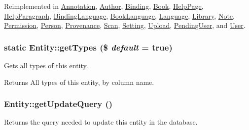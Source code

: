 Reimplemented in \hyperlink{classAnnotation_a9bc4933ab99e52e31b622a9829edd4bb}{Annotation}, \hyperlink{classAuthor_a83c8f19c169bcfffb4e0df09fadafe26}{Author}, \hyperlink{classBinding_aee5dd30aab182b19046ab5164da4c649}{Binding}, \hyperlink{classBook_ae4b3d3747fad76af4e4724a4bcf749a3}{Book}, \hyperlink{classHelpPage_a28380b31bea21840c86ab69c49cad198}{HelpPage}, \hyperlink{classHelpParagraph_a646492a40dad4d4a5cad0cd93e4e7cdb}{HelpParagraph}, \hyperlink{classBindingLanguage_a0f5427a1846d14c04dee6c35c73a0781}{BindingLanguage}, \hyperlink{classBookLanguage_a755bc7ed42e5d959d88a387485279ebd}{BookLanguage}, \hyperlink{classLanguage_a262653445a1324d6c02099e01cab0dff}{Language}, \hyperlink{classLibrary_a0b5dbae3b3d7138ad86c7df6e6a433eb}{Library}, \hyperlink{classNote_a83deedb316c670baa4b31c8d512e6af6}{Note}, \hyperlink{classPermission_a9a6694ebca8793f08c3f3388c27e0645}{Permission}, \hyperlink{classPerson_ab68a8aed417028b7755fb8c6c6fb2b62}{Person}, \hyperlink{classProvenance_ae8dd5db6f4bdc8c131f625b7e1287827}{Provenance}, \hyperlink{classScan_ad9ada4df484a671439f131458e22d2e0}{Scan}, \hyperlink{classSetting_ada9934fb4f6bddcf5250494b63d81c5e}{Setting}, \hyperlink{classUpload_a9c147629f26a6d0c7b32136eba761869}{Upload}, \hyperlink{classPendingUser_a8daaf97b6d90a79598d1354c872ac65c}{PendingUser}, and \hyperlink{classUser_a3641dffbe0835b6cc56e875b21cba4b1}{User}.

\hypertarget{classEntity_aa496a11969dfae2753cfa2a8b5c8e53e}{
\subsubsection[{getTypes}]{\setlength{\rightskip}{0pt plus 5cm}static Entity::getTypes (\$ {\em default} = {\ttfamily true})}}
\label{classEntity_aa496a11969dfae2753cfa2a8b5c8e53e}
Gets all types of this entity.

\begin{DoxyReturn}{Returns}
All types of this entity, by column name. 
\end{DoxyReturn}
\hypertarget{classEntity_ae66be26f01323911fbb59dc3a135dbf8}{
\subsubsection[{getUpdateQuery}]{\setlength{\rightskip}{0pt plus 5cm}Entity::getUpdateQuery ()}}
\label{classEntity_ae66be26f01323911fbb59dc3a135dbf8}
Returns the query needed to update this entity in the database.

